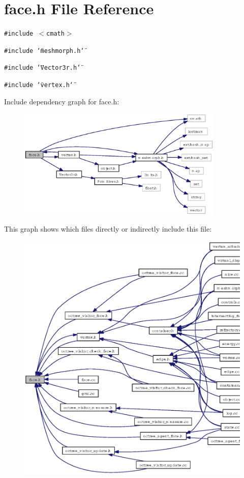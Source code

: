 \section{face.h File Reference}
\label{face_8h}
{\tt \#include $<$cmath$>$}\par
{\tt \#include \char`\"{}meshmorph.h\char`\"{}}\par
{\tt \#include \char`\"{}Vector3r.h\char`\"{}}\par
{\tt \#include \char`\"{}vertex.h\char`\"{}}\par


Include dependency graph for face.h:\begin{figure}[H]
\begin{center}
\leavevmode
\includegraphics[width=279pt]{face_8h__incl}
\end{center}
\end{figure}


This graph shows which files directly or indirectly include this file:\begin{figure}[H]
\begin{center}
\leavevmode
\includegraphics[width=320pt]{face_8h__dep__incl}
\end{center}
\end{figure}
